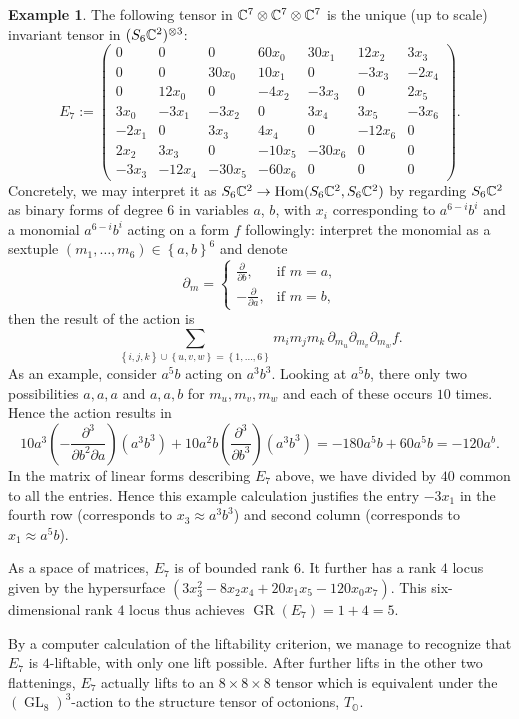\documentclass[a4paper,10pt]{article}
\def\oct{\mathbb O}
\def\zav#1{\left(#1\right)}
\def\set#1{\left\{#1\right\}}
\def\mtrx#1{\begin{pmatrix}#1\end{pmatrix}}
\DeclareMathOperator{\Hom}{Hom}\let\hom\Hom
\DeclareMathOperator{\GR}{GR}
\DeclareMathOperator{\GL}{GL}
\theoremstyle{definition}
\newtheorem{example}[theorem]{Example}
\theoremstyle{remark}
\begin{document}
\begin{example}
The following tensor in $\ce^7\otimes\ce^7\otimes\ce^7$ is the unique (up to scale) invariant tensor in $(S_6\ce^2)^{\otimes3}$:
\[
    E_7 := \mtrx{
        0 &      0 &      0 &  60x_0 &  30x_1 &  12x_2 &   3x_3 \\
        0 &      0 &  30x_0 &  10x_1 &      0 &  -3x_3 &  -2x_4 \\
        0 &  12x_0 &      0 &  -4x_2 &  -3x_3 &      0 &   2x_5 \\
        3x_0 &  -3x_1 &  -3x_2 &      0 &   3x_4 &   3x_5 &  -3x_6 \\
        -2x_1 &      0 &   3x_3 &   4x_4 &      0 & -12x_6 &      0 \\
        2x_2 &   3x_3 &      0 & -10x_5 & -30x_6 &      0 &      0 \\
        -3x_3 & -12x_4 & -30x_5 & -60x_6 &      0 &      0 &      0
    }.
\]
Concretely, we may interpret it as $S_6\ce^2\to \Hom(S_6\ce^2, S_6\ce^2)$ by regarding $S_6\ce^2$ as binary forms of degree $6$ in variables $a$, $b$, with $x_i$ corresponding to $a^{6-i}b^i$ and a monomial $a^{6-i}b^i$ acting on a form $f$ followingly: interpret the monomial as a sextuple $(m_1,\dots,m_6)\in \set{a,b}^6$ and denote
\[
    \partial_m = \begin{cases}
        \frac{\partial}{\partial b}, & \text{if $m=a$,}\\
        -\frac{\partial}{\partial a}, & \text{if $m=b$,}
    \end{cases}
\]
then the result of the action is
\[
    \sum_{\set{i,j,k}\cup\set{u,v,w}=\set{1,\dots,6}} m_im_jm_k\, \partial_{m_u}\partial_{m_v}\partial_{m_w}f.
\]
As an example, consider $a^5b$ acting on $a^3b^3$. Looking at $a^5b$, there only two possibilities $a,a,a$ and $a,a,b$ for $m_u,m_v,m_w$ and each of these occurs $10$ times. Hence the action results in
\[
    10 a^3\zav{-\frac{\partial^3}{\partial b^2\partial a}} (a^3b^3) + 10a^2b \zav{\frac{\partial^3}{\partial b^3}} (a^3b^3) = -180a^5b + 60a^5b = -120a^b.
\]
In the matrix of linear forms describing $E_7$ above, we have divided by $40$ common to all the entries. Hence this example calculation justifies the entry $-3x_1$ in the fourth row (corresponds to $x_3\approx a^3b^3$) and second column (corresponds to $x_1\approx a^5b$).

As a space of matrices, $E_7$ is of bounded rank $6$. It further has a rank $4$ locus given by the hypersurface $(3x_3^2-8x_2x_4+20x_1x_5-120x_0x_7)$. This six-dimensional rank $4$ locus thus achieves $\GR(E_7) = 1+4=5$.

By a computer calculation of the liftability criterion, we manage to recognize that $E_7$ is $4$-liftable, with only one lift possible. After further lifts in the other two flattenings, $E_7$ actually lifts to an $8\times 8\times 8$ tensor which is equivalent under the $(\GL_8)^3$-action to the structure tensor of octonions, $T_{\oct}$.
\end{example}
\end{document}
